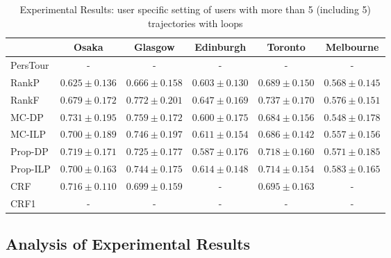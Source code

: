 \begin{table*}
\centering
\caption{Experimental Results: user specific setting of users with more than 5 (including 5) trajectories with loops}
\begin{tabular}{l|ccccc} \hline
 & Osaka & Glasgow & Edinburgh & Toronto & Melbourne \\ \hline
PersTour & - & - & - & - & - \\
RankP & $0.625\pm0.136$ & $0.666\pm0.158$ & $0.603\pm0.130$ & $0.689\pm0.150$ & $0.568\pm0.145$ \\
RankF & $0.679\pm0.172$ & $0.772\pm0.201$ & $0.647\pm0.169$ & $0.737\pm0.170$ & $0.576\pm0.151$ \\
MC-DP & $0.731\pm0.195$ & $0.759\pm0.172$ & $0.600\pm0.175$ & $0.684\pm0.156$ & $0.548\pm0.178$ \\
MC-ILP & $0.700\pm0.189$ & $0.746\pm0.197$ & $0.611\pm0.154$ & $0.686\pm0.142$ & $0.557\pm0.156$ \\
Prop-DP & $0.719\pm0.171$ & $0.725\pm0.177$ & $0.587\pm0.176$ & $0.718\pm0.160$ & $0.571\pm0.185$ \\
Prop-ILP & $0.700\pm0.163$ & $0.744\pm0.175$ & $0.614\pm0.148$ & $0.714\pm0.154$ & $0.583\pm0.165$ \\
CRF & $0.716\pm0.110$ & $0.699\pm0.159$ & - & $0.695\pm0.163$ & - \\
CRF1 & - & - & - & - & - \\
\hline
\end{tabular}
\end{table*}




\subsection{Analysis of Experimental Results}
\label{experiment:analysis}
